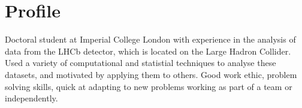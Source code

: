 \makecvtitle


\section{Profile}
\cvline{}{}
{
  Doctoral student at Imperial College London with experience in the analysis of data
  from the LHCb detector, which is located on the Large Hadron Collider.
  Used a variety of computational and statistial techniques to analyse these datasets, and
  motivated by applying them to others.
  Good work ethic, problem solving skills, quick at adapting to new problems working as part of a
  team or independently.
}


